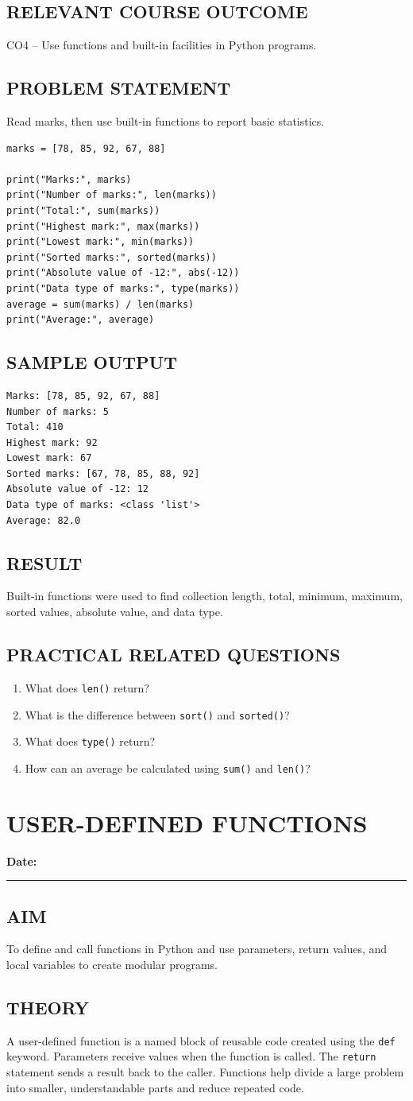 \documentclass[12pt,a4paper]{report}
\newcommand{\experimentdate}{\hfill\textbf{Date:} \rule{3cm}{0.4pt}}
\newcommand{\aim}[1]{\section*{AIM}#1}
\newcommand{\result}[1]{\section*{RESULT}#1}
\newcommand{\courseoutcome}[1]{\section*{RELEVANT COURSE OUTCOME}#1}
\newcommand{\questions}[1]{\section*{PRACTICAL RELATED QUESTIONS}#1}
\newcommand{\sampleoutput}{\section*{SAMPLE OUTPUT}}
\begin{document}
\courseoutcome{CO4 -- Use functions and built-in facilities in Python programs.}

\section*{PROBLEM STATEMENT}
Read marks, then use built-in functions to report basic statistics.

\begin{lstlisting}
marks = [78, 85, 92, 67, 88]

print("Marks:", marks)
print("Number of marks:", len(marks))
print("Total:", sum(marks))
print("Highest mark:", max(marks))
print("Lowest mark:", min(marks))
print("Sorted marks:", sorted(marks))
print("Absolute value of -12:", abs(-12))
print("Data type of marks:", type(marks))
average = sum(marks) / len(marks)
print("Average:", average)
\end{lstlisting}

\sampleoutput
\begin{verbatim}
Marks: [78, 85, 92, 67, 88]
Number of marks: 5
Total: 410
Highest mark: 92
Lowest mark: 67
Sorted marks: [67, 78, 85, 88, 92]
Absolute value of -12: 12
Data type of marks: <class 'list'>
Average: 82.0
\end{verbatim}

\result{Built-in functions were used to find collection length, total, minimum, maximum, sorted values, absolute value, and data type.}

\questions{
\begin{enumerate}
\item What does \texttt{len()} return?
\item What is the difference between \texttt{sort()} and \texttt{sorted()}?
\item What does \texttt{type()} return?
\item How can an average be calculated using \texttt{sum()} and \texttt{len()}?
\end{enumerate}}

\chapter{USER-DEFINED FUNCTIONS}
\experimentdate

\aim{To define and call functions in Python and use parameters, return values, and local variables to create modular programs.}

\section*{THEORY}
A user-defined function is a named block of reusable code created using the \texttt{def}
keyword. Parameters receive values when the function is called. The \texttt{return}
statement sends a result back to the caller. Functions help divide a large problem into
smaller, understandable parts and reduce repeated code.
\end{document}
